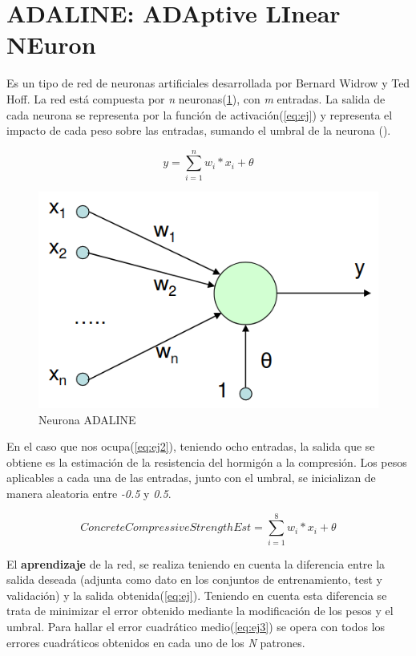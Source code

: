 \documentclass[11pt,spanish,listoffigures,listoftables]{workluis}
\begin{document}
\section{ADALINE: ADAptive LInear NEuron}

\par Es un tipo de red de neuronas artificiales desarrollada por Bernard Widrow y Ted Hoff. La red está compuesta por \textit{n} neuronas(\ref{fig:adaline}), con \textit{m} entradas. La salida de cada neurona se representa por la función de activación(\ref{eq:ej}) y representa el impacto de cada peso sobre las entradas, sumando el umbral de la neurona (\theta).

\begin{equation}\label{eq:ej}
y = \sum_{i=1}^{n}w_{i}*x_{i} + \theta
\end{equation}

\begin{figure}
\centering
\includegraphics[scale=0.5]{adaline}
\caption{Neurona ADALINE \cite{Adaline}}\label{fig:adaline}
\end{figure}

\par En el caso que nos ocupa(\ref{eq:ej2}), teniendo ocho entradas, la salida que se obtiene es la estimación de la resistencia del hormigón a la compresión. Los pesos aplicables a cada una de las entradas, junto con el umbral, se inicializan de manera aleatoria entre \textit{-0.5} y \textit{0.5}.

\begin{equation}\label{eq:ej2}
ConcreteCompressiveStrengthEst = \sum_{i=1}^{8}w_{i}*x_{i} + \theta
\end{equation}

\par El \textbf{aprendizaje} de la red, se realiza teniendo en cuenta la diferencia entre la salida deseada (adjunta como dato en los conjuntos de entrenamiento, test y validación) y la salida obtenida(\ref{eq:ej}). Teniendo en cuenta esta diferencia se trata de minimizar el error obtenido mediante la modificación de los pesos y el umbral. Para hallar el error cuadrático medio(\ref{eq:ej3}) se opera con todos los errores cuadráticos obtenidos en cada uno de los \textit{N} patrones. 
\end{document}
